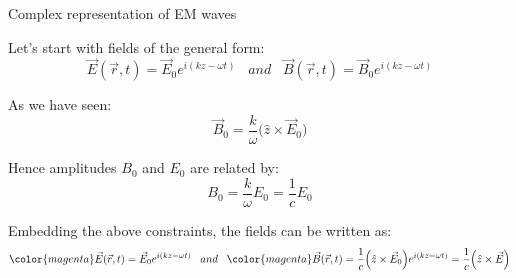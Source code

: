 %
%
%
%
%
%
%
%

%
%
%

\begin{frame}{Complex representation of EM waves}

Let's start with fields of the general form:
\begin{equation*}
    \vec{E}(\vec{r},t) = \vec{E}_0  e^{i (kz-\omega t)}
    \;\;\; and \;\;\;
    \vec{B}(\vec{r},t) = \vec{B}_0  e^{i (kz-\omega t)}
\end{equation*}

As we have seen:
\begin{equation*}
       \vec{B}_{0} = \frac{k}{\omega} \Big( \hat{z} \times \vec{E}_0 \Big)
\end{equation*}

Hence amplitudes $B_{0}$ and $E_{0}$ are related by:
\begin{equation*}
     B_{0} = \frac{k}{\omega} E_0 = \frac{1}{c} E_0
\end{equation*}

Embedding the above constraints, the fields can be written as:
\begin{equation*}
    {\color{magenta} \vec{E}(\vec{r},t) = \vec{E}_0  e^{i (kz-\omega t)}  }
    \;\;\; and \;\;\;
    {\color{magenta} \vec{B}(\vec{r},t) = \frac{1}{c} \Big( \hat{z}
      \times \vec{E}_0 \Big)  e^{i (kz-\omega t)} = \frac{1}{c} \Big(
      \hat{z} \times \vec{E} \Big) }
\end{equation*}


\end{frame}


